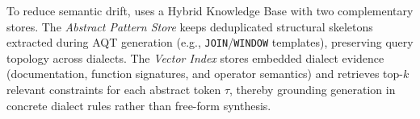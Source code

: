\documentclass[sigconf,review,anonymous]{acmart}
\begin{document}
    

To reduce semantic drift, \tool{} uses a Hybrid Knowledge Base with two complementary stores. 
The \textit{Abstract Pattern Store} keeps deduplicated structural skeletons extracted during AQT generation (e.g., \texttt{JOIN}/\texttt{WINDOW} templates), preserving query topology across dialects. 
The \textit{Vector Index} stores embedded dialect evidence (documentation, function signatures, and operator semantics) and retrieves top-$k$ relevant constraints for each abstract token $\tau$, thereby grounding generation in concrete dialect rules rather than free-form synthesis.



\end{document}
